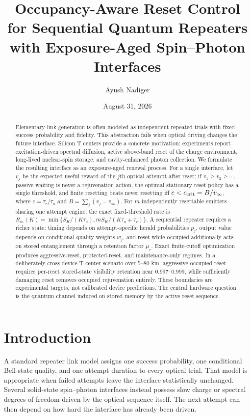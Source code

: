 \documentclass[aps,prx,reprint,superscriptaddress,nofootinbib,longbibliography,floatfix]{revtex4-2}
\begin{document}
\title{Occupancy-Aware Reset Control for Sequential Quantum Repeaters with Exposure-Aged Spin--Photon Interfaces}
\author{Ayush Nadiger}
\date{August 31, 2026}

\begin{abstract}
Elementary-link generation is often modeled as independent repeated trials with fixed success probability and fidelity. This abstraction fails when optical driving changes the future interface. Silicon T centers provide a concrete motivation: experiments report excitation-driven spectral diffusion, active above-band reset of the charge environment, long-lived nuclear-spin storage, and cavity-enhanced photon collection. We formulate the resulting interface as an exposure-aged renewal process. For a single interface, let $v_j$ be the expected useful reward of the $j$th optical attempt after reset; if $v_1\ge v_2\ge\cdots$, passive waiting is never a rejuvenation action, the optimal stationary reset policy has a single threshold, and finite resetting beats never resetting iff $c<c_{\rm crit}=B/v_\infty$, where $c=\tau_r/\tau_a$ and $B=\sum_j(v_j-v_\infty)$. For $m$ independently resettable emitters sharing one attempt engine, the exact fixed-threshold rate is $R_m(K)=\min\{S_K/(K\tau_a),mS_K/(K\tau_a+\tau_r)\}$. A sequential repeater requires a richer state: timing depends on attempt-specific herald probabilities $p_j$, output value depends on conditional quality weights $w_j$, and reset while occupied additionally acts on stored entanglement through a retention factor $\mu_r$. Exact finite-cutoff optimization produces aggressive-reset, protected-reset, and maintenance-only regimes. In a deliberately cross-device T-center scenario over 5--80 km, aggressive occupied reset requires per-reset stored-state visibility retention near 0.997--0.999, while sufficiently damaging reset removes occupied rejuvenation entirely. These boundaries are experimental targets, not calibrated device predictions. The central hardware question is the quantum channel induced on stored memory by the active reset sequence.
\end{abstract}
\maketitle

\section{Introduction}
A standard repeater link model assigns one success probability, one conditional Bell-state quality, and one attempt duration to every optical trial. That model is appropriate when failed attempts leave the interface statistically unchanged. Several solid-state spin--photon interfaces instead possess slow charge or spectral degrees of freedom driven by the optical sequence itself. The next attempt can then depend on how hard the interface has already been driven.
\end{document}
